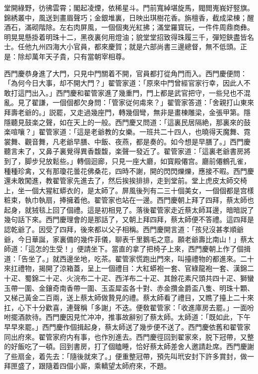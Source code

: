 \begin{myquote}
堂開綠野，彷彿雲霄；閣起凌煙，依稀星斗。門前寬綽堪旋馬，閥閲嵬峩好竪旗。錦綉叢中，風送到畫眉聲巧；金銀堆裏，日映出琪樹花香。旃檀香，截成梁棟；醒酒石，滿砌階除。左右肉屏風，一個個夷光紅拂；滿堂羅寳玩，一件件周鼎商彝。明晃晃懸掛着明珠十二，黑夜裏何用燈油；貌堂堂招致得珠履三千，彈短鋏盡皆名士。任他九州四海大小官員，都來慶賀；就是六部尚書三邊總督，無不低頭。正是：除却萬年天子貴，只有當朝宰相尊。
\end{myquote}

西門慶恭身進了大門，只見中門關着不開，官員都打從角門而入。西門慶便問：「為何今日大事，却不開大門？」翟管家道：「原來中門曾經官家行幸，因此人不敢打這門出入。」西門慶和翟管家進了幾重門，門上都是武官把守，一些兒也不混亂。見了翟謙，一個個都欠身問：「管家従何䖏來？」翟管家答道：「舍親打山東來拜壽老爺的。」説罷，又走過幾座門，轉幾個彎，無非是畫棟雕梁，金張甲第。隱隱聽見鼓楽之聲，如在天上的一般。西門慶又問道：「這裏民居隔絶，那裏來的鼓楽喧嚷？」翟管家道：「這是老爺教的女樂。一班共二十四人，也曉得天魔舞、霓裳舞、觀音舞，凡老爺早膳、中飯、夜燕，都是奏的。如今想是早膳了。」西門慶聽言未了，又鼻子裏覺得異香馥馥，楽聲一發近了。翟管家道：「這裏老爺書房將到了，脚步兒放鬆些。」轉個迴廊，只見一座大廳，如寳殿僊宫。廳前僊鶴孔雀，種種珍禽，又有那瓊花曇花佛桑花，四時不謝，開的閃閃爍爍，應接不暇。西門慶還未敢闖進，教翟管家先進去了，然后挨挨排排，走到堂前。堂上虎皮太師交椅上，坐一個大猩紅蟒衣的，是太師了。屏風後列有二三十個美女，一個個都是宫樣粧束，執巾執扇，捧擁着他。翟管家也站在一邊。西門慶朝上拜了四拜，蔡太師也起身，就狨毯上回了個禮。這是初相見了。落後翟管家走近蔡太師耳邊，暗暗説了幾句話下來。西門慶理會的是那話了，又朝上拜四拜，蔡太師便不答禮。這四拜是認乾爺了。因受了四拜，後來都以父子相稱。西門慶開言道：「孩兒沒甚孝順爺爺，今日華誕，家裏備的幾件菲儀，聊表千里鵝毛之意。願老爺壽比南山！」蔡太師道：「這怎的生受！」便請坐下。當直的拿了把椅子上來，西門慶朝上作了個揖道：「告坐了。」就西邊坐地，吃茶。翟管家慌跑出門來，叫擡禮物的都進來。二十來扛禮物，揭開了涼箱蓋，呈上一個禮目：大紅蟒袍一套、官綠龍袍一套、漢錦二十疋、蜀錦二十疋、火浣布二十疋、西洋布二十疋、其餘花素尺頭共四十疋、獅蠻玉帶一圍、金鑲奇南香帶一圍、玉盃犀盃各十對、赤金攢金爵盃八隻、明珠十顆、又梯己黃金二百兩，送上蔡太師做贄見的禮。蔡太師看了禮目，又瞧了擡上二十來扛，心下十分歡喜，連聲稱「多謝」不迭。便敎翟管家：「收進庫房去罷。」一面吩咐擺酒款待。西門慶因見忙冲冲，推事故辭别了蔡太師。太師道：「既如此，下午早早來罷。」西門慶作個揖起身，蔡太師送了幾步便不送了。西門慶依舊和翟管家同出府來。翟管家府内有事，也作別進去。西門慶徑回到翟家來，脱下冠帶，又整的好飯吃了一頓。回到書房，打了個瞌睡，恰好蔡太師差舍人邀請赴席。西門慶謝了些扇金，着先去：「隨後就來了。」便重整冠帶，預先叫玳安封下許多賞封，做一拜匣盛了，跟隨着四個小廝，乘轎望太師府來，不題。

